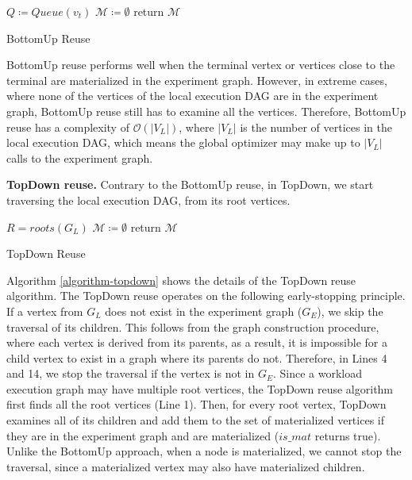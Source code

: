 \begin{algorithm}[h]
$Q \coloneqq  Queue(v_t)$\;
$\mathcal{M} \coloneqq \emptyset$\;
return $\mathcal{M}$\;
\caption{BottomUp Reuse}\label{algorithm-bottomup}
\end{algorithm}
BottomUp reuse performs well when the terminal vertex or vertices close to the terminal are materialized in the experiment graph.
However, in extreme cases, where none of the vertices of the local execution DAG are in the experiment graph, BottomUp reuse still has to examine all the vertices.
Therefore, BottomUp reuse has a complexity of $\mathcal{O}(|V_L|)$, where $|V_L|$ is the number of vertices in the local execution DAG, which means the global optimizer may make up to $|V_L|$ calls to the experiment graph.

\textbf{TopDown reuse.}
Contrary to the BottomUp reuse, in TopDown, we start traversing the local execution DAG, from its root vertices.

\begin{algorithm}[h]
$R=roots(G_L)$\;
$\mathcal{M} \coloneqq \emptyset$\;
return $\mathcal{M}$\;
\caption{TopDown Reuse}\label{algorithm-topdown}
\end{algorithm}
Algorithm \ref{algorithm-topdown} shows the details of the TopDown reuse algorithm.
The TopDown reuse operates on the following early-stopping principle.
If a vertex from $G_L$ does not exist in the experiment graph ($G_E$), we skip the traversal of its children.
This follows from the graph construction procedure, where each vertex is derived from its parents, as a result, it is impossible for a child vertex to exist in a graph where its parents do not.
Therefore, in Lines 4 and 14, we stop the traversal if the vertex is not in $G_E$.
Since a workload execution graph may have multiple root vertices, the TopDown reuse algorithm first finds all the root vertices (Line 1).
Then, for every root vertex, TopDown examines all of its children and add them to the set of materialized vertices if they are in the experiment graph and are materialized ($is\_mat$ returns true).
Unlike the BottomUp approach, when a node is materialized, we cannot stop the traversal, since a materialized vertex may also have materialized children.

